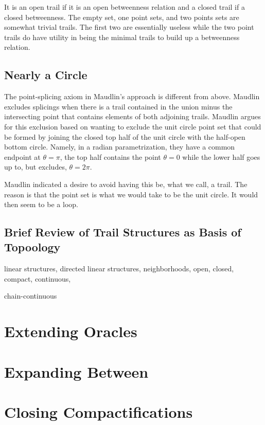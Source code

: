 \documentclass[12pt]{article}
\begin{document}
It is an open trail if it is an open betweenness relation and a closed trail if a closed betweenness. The empty set, one point sets, and two points sets are somewhat trivial trails. The first two are essentially useless while the two point trails do have utility in being the minimal trails to build up a betweenness relation. 



\subsection{Nearly a Circle}

The point-splicing axiom in Maudlin's approach is different from above. Maudlin excludes splicings when there is a trail contained in the union minus the intersecting point that contains elements of both adjoining trails. Maudlin argues for this exclusion based on wanting to exclude the unit circle point set that could be formed by joining the closed top half of the unit circle with the half-open bottom circle. Namely, in a radian parametrization, they have a common endpoint at $\theta=\pi$, the top half contains the point $\theta=0$ while the lower half goes up to, but excludes, $\theta = 2\pi$. 

Maudlin indicated a desire to avoid having this be, what we call, a trail.  The reason is that the point set is what we would take to be the unit circle. It would then seem to be a loop.  

\subsection{Brief Review of Trail Structures as Basis of Topoology}

linear structures, directed linear structures, neighborhoods, open, closed, compact, continuous, 

chain-continuous

\section{Extending Oracles}




\section{Expanding Between}



\section{Closing Compactifications}
\end{document}

